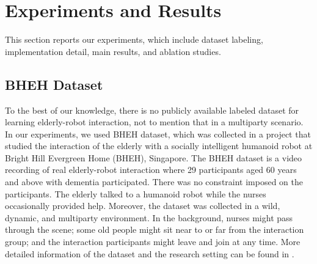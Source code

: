\documentclass[VANCOUVER,STIX1COL]{WileyNJD-v2}
\begin{document}
\section{Experiments and Results}
\label{s:Experiments_and_Results}
This section reports our experiments, which include dataset labeling, implementation detail, main results, and ablation studies.

\subsection{BHEH Dataset}
\label{subs:BHEH_Dataset}

To the best of our knowledge, there is no publicly available labeled dataset for learning elderly-robot interaction, not to mention that in a multiparty scenario. In our experiments, we used BHEH dataset, which was collected in a project that studied the interaction of the elderly with a socially intelligent humanoid robot at Bright Hill Evergreen Home (BHEH), Singapore.
The BHEH dataset is a video recording of real elderly-robot interaction where 29 participants aged 60 years   and above with dementia participated. There was no constraint imposed on the participants. The elderly talked to a humanoid robot while the nurses occasionally provided help. Moreover, the dataset was collected in a wild, dynamic, and multiparty environment. In the background, nurses might pass through the scene; some old people might sit near to or far from the interaction group; and the interaction participants might leave and join at any time.
More detailed information of the dataset and the research setting can be found in \cite{Mishra2021Does,Tulsulkar2021Can}.
\end{document}
